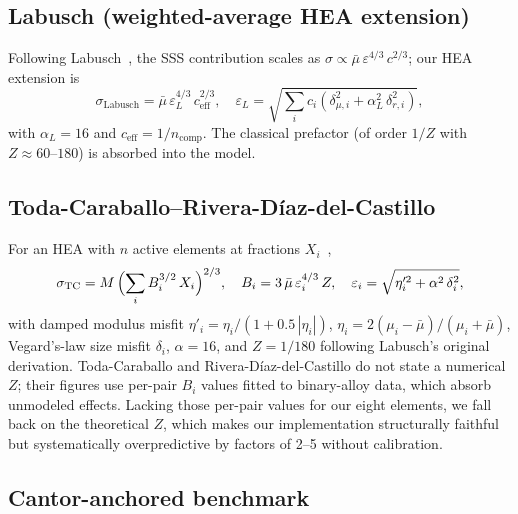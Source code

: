 \documentclass[11pt]{article}
\begin{document}
\subsection{Labusch (weighted-average HEA extension)}

Following Labusch~\cite{Labusch1970}, the SSS contribution scales as $\sigma \propto \bar{\mu}\,\varepsilon^{4/3}\,c^{2/3}$; our HEA extension is
\begin{equation}
\sigma_\text{Labusch} = \bar{\mu}\,\varepsilon_L^{4/3}\,c_\text{eff}^{2/3}, \quad
\varepsilon_L = \sqrt{\sum_i c_i \left(\delta_{\mu,i}^2 + \alpha_L^2\,\delta_{r,i}^2\right)},
\label{eq:labusch}
\end{equation}
with $\alpha_L = 16$ and $c_\text{eff} = 1/n_\text{comp}$. The classical prefactor (of order $1/Z$ with $Z \approx 60$--$180$) is absorbed into the model.

\subsection{Toda-Caraballo--Rivera-D\'{i}az-del-Castillo}

For an HEA with $n$ active elements at fractions $X_i$~\cite{TodaCaraballo2015},
\begin{equation}
\sigma_\text{TC} = M\,\Bigl(\sum_i B_i^{3/2}\,X_i\Bigr)^{2/3},
\quad
B_i = 3\,\bar{\mu}\,\varepsilon_i^{4/3}\,Z,
\quad
\varepsilon_i = \sqrt{\eta'^2_i + \alpha^2\,\delta_i^2},
\label{eq:tc}
\end{equation}
with damped modulus misfit $\eta'_i = \eta_i / (1 + 0.5\,|\eta_i|)$, $\eta_i = 2(\mu_i - \bar{\mu})/(\mu_i + \bar{\mu})$, Vegard's-law size misfit $\delta_i$, $\alpha = 16$, and $Z = 1/180$ following Labusch's original derivation. Toda-Caraballo and Rivera-D\'{i}az-del-Castillo do not state a numerical $Z$; their figures use per-pair $B_i$ values fitted to binary-alloy data, which absorb unmodeled effects. Lacking those per-pair values for our eight elements, we fall back on the theoretical $Z$, which makes our implementation structurally faithful but systematically overpredictive by factors of 2--5 without calibration.

\subsection{Cantor-anchored benchmark}
\end{document}
